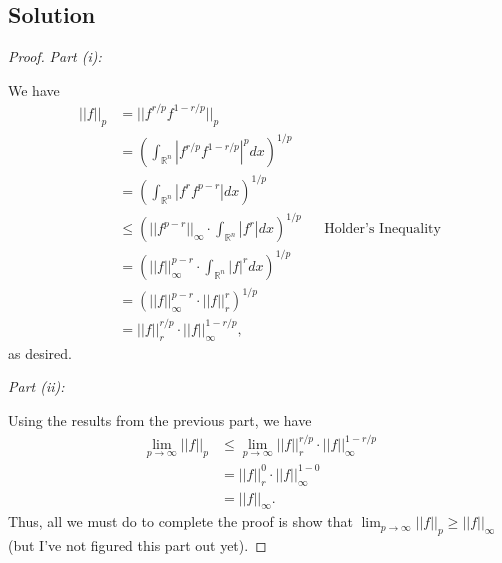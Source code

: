 \documentclass[10pt,a4paper]{article}
\makeatletter
\theoremstyle{theorem}
\newcommand{\proofpart}[2]{%
  \par
  \addvspace{\medskipamount}%
  \noindent\emph{Part #1: #2}\par\nobreak
  \addvspace{\smallskipamount}%
  \@afterheading
}
\theoremstyle{definition}
\makeatother
\begin{document}
\subsection*{Solution}
\begin{proof}
\proofpart{(i)}{} We have
\begin{align*}
||f||_p &= ||f^{r/p} f^{1 - r/p}||_p\\
&= \left( \int_{\mathbb{R}^n} |f^{r/p} f^{1 - r/p}|^p dx \right)^{1/p}\\
&= \left( \int_{\mathbb{R}^n} |f^{r} f^{p - r}| dx \right)^{1/p}\\
&\leq \left(||f^{p - r}||_\infty \cdot \int_{\mathbb{R}^n} |f^{r} | dx \right)^{1/p} &&\text{Holder's Inequality}\\
&= \left(||f||_\infty^{p - r} \cdot \int_{\mathbb{R}^n} |f|^{r} dx \right)^{1/p}\\
&= \left(||f||_\infty^{p - r} \cdot ||f||_r^r \right)^{1/p}\\
&= ||f||_r^{r/p} \cdot ||f||_\infty^{1 - r/p},
\end{align*}
as desired.

\proofpart{(ii)}{}
Using the results from the previous part, we have
\begin{align*}
\lim_{p \to \infty} ||f||_p &\leq \lim_{p \to \infty} ||f||_r^{r/p} \cdot ||f||_\infty^{1 - r/p}\\
&= ||f||_r^{0} \cdot ||f||_\infty^{1 - 0}\\
&= ||f||_\infty.
\end{align*}
Thus, all we must do to complete the proof is show that $\lim_{p \to \infty} ||f||_p \geq ||f||_\infty$ (but I've not figured this part out yet).
\end{proof}
\end{document}
